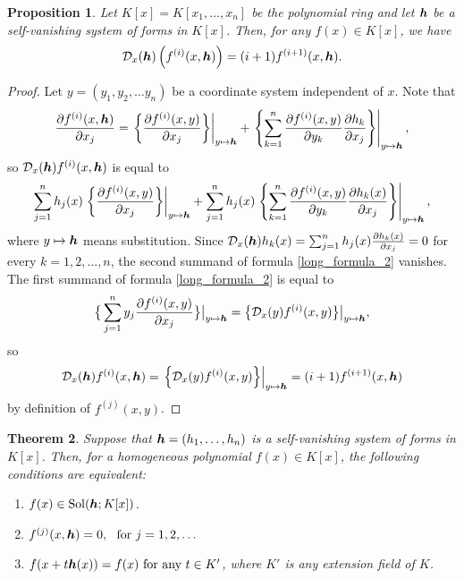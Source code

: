 \documentclass[12pt]{article}
\newtheorem{theorem}{Theorem}[section]
\newtheorem{proposition}[theorem]{Proposition}
\theoremstyle{definition}
\theoremstyle{remark}
\def\cD{{\cal D}}
\def\sol{{\rm Sol}}
\def\boldh{\mbox{\boldmath $h$}}
\def\tinyh{\mbox{\scriptsize \boldmath $h$}}
\def\pa{\partial}
\begin{document}
\begin{proposition}  \label{svs_behaves_as_variables}   %
Let $K[x]=K[x_1, \ldots, x_n]$ be the polynomial ring and 
let  $\boldh$  be  a self-vanishing system of forms in $K[x]$.  
Then, for any $f(x) \in K[x]$, we have 
\[\cD _x(\boldh)\left(     f^{(i)}(x, \boldh)   \right) = (i+1)f^{(i+1)}(x, \boldh). \]
\end{proposition}
\begin{proof}
Let $y=(y_1, y_2, \ldots y_n)$ be a coordinate system independent of $x$. 
Note that 
\[
\frac{\pa f^{(i)}(x,\boldh)}{\pa x_j} =\left.\left\{\frac{\pa f^{(i)}(x,y)}{\pa x_j} \right\}\right|_{y \mapsto \tinyh} + 
\left.\left\{\sum _{k=1}^n  \frac{\pa f^{(i)}(x,y)}{\pa y_k}\frac{\pa h_k}{\pa x_j}   \right\}\right|_{y \mapsto \tinyh}, 
\]
so $\cD_x(\boldh)f^{(i)}(x, \boldh)$ is equal to
\begin{equation} \label{long_formula_2}
\sum _{j=1}^nh_j(x)\left.\left\{\frac{\pa f^{(i)}(x,y)}{\pa x_j} \right\}\right|_{y \mapsto \tinyh} 
+ \sum _{j=1}^n h_j(x)\left.\left\{\sum _{k=1}^n  \frac{\pa f^{(i)}(x,y)}{\pa y_k}\frac{\pa h_k(x)}{\pa x_j}   \right\}\right|_{y \mapsto \tinyh}, 
\end{equation}
where $y \mapsto \boldh$ means substitution.
Since $\cD_x(\boldh)h_k(x)=\sum _{j=1}^n h_j(x)\frac{\pa h_k(x)}{\pa x_j}=0$ for every $k=1,2,  \ldots, n$, 
the second summand of formula \eqref{long_formula_2} vanishes. The first summand of 
formula \eqref{long_formula_2} is equal to
$$\big\{\sum_{j=1}^n y_j \frac{\pa f^{(i)}(x,y)}{\pa x_j}\big\}\big|_{y \mapsto \tinyh}
= \big\{\cD_x(y)f^{(i)}(x,y) \big\} \big|_{y \mapsto \tinyh},$$ 
so
\[
\cD_x(\boldh)f^{(i)}(x, \boldh) = \left.\left\{\cD_x(y)f^{(i)}(x,y) \right\} \right|_{y \mapsto \tinyh}
= (i+1) f^{(i+1)}(x,\boldh)
\]
by definition of $f^{(j)}(x,y)$.
\end{proof}


\begin{theorem} \label{mainthm_1}   %
Suppose that $\boldh=(h_1, \ldots, h_n)$ is a self-vanishing system of forms  in $K[x]$. 
Then, for a homogeneous polynomial $f(x) \in K[x]$, the following conditions are equivalent:
\begin{enumerate}
\item[$(a)$]
$f(x) \in \sol(\boldh; K[x])$.
\item[$(b)$]
$f^{(j)}(x, \boldh) =0, \ \mbox{ for } j=1,2, \ldots $
\item[$(c)$]
$f(x+t\boldh(x))=f(x) \ \mbox{for any } t \in K'$, where $K'$ is any extension field of $K$. 
\end{enumerate}
\end{theorem}
\end{document}

